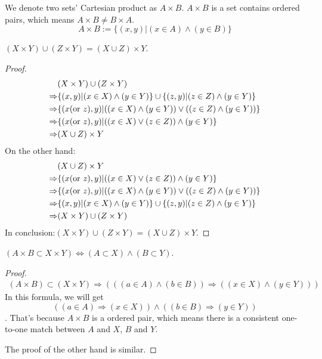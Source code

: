 We denote two sets' Cartesian product as $A \times B $.
$A\times B$ is a set contains ordered pairs, which means $A\times B\neq B\times A$.
\[A\times B:=\{(x,y)|(x\in A)\wedge(y\in B)\}\]
\begin{question}
    $(X\times Y)\cup (Z\times Y)=(X\cup Z)\times Y$.
\end{question}
\begin{proof}
    \[\begin{aligned}
        &(X\times Y)\cup (Z\times Y)\\\Rightarrow&\{(x,y)|(x\in X)\wedge(y\in Y)\}\cup \{(z,y)|(z\in Z)\wedge(y\in Y)\}\\\Rightarrow&\{(x ({\rm or}\ z),y)|((x\in X)\wedge(y\in Y))\vee((z\in Z)\wedge(y\in Y))\}\\\Rightarrow&\{(x ({\rm or}\ z),y)|((x\in X)\vee (z\in Z))\wedge(y\in Y)\}\\\Rightarrow&(X\cup Z)\times Y
    \end{aligned}\]
    On the other hand:
    \[\begin{aligned}
        &(X\cup Z)\times Y\\\Rightarrow&\{(x ({\rm or}\ z),y)|((x\in X)\vee (z\in Z))\wedge(y\in Y)\}\\\Rightarrow&\{(x ({\rm or}\ z),y)|((x\in X)\wedge(y\in Y))\vee((z\in Z)\wedge(y\in Y))\}\\\Rightarrow&\{(x,y)|(x\in X)\wedge(y\in Y)\}\cup \{(z,y)|(z\in Z)\wedge(y\in Y)\}\\\Rightarrow&(X\times Y)\cup (Z\times Y)
    \end{aligned}\]
    In conclusion:$(X\times Y)\cup (Z\times Y)=(X\cup Z)\times Y$.
\end{proof}
\begin{question}
    $(A\times B\subset X\times Y)\Leftrightarrow(A\subset X)\wedge(B\subset Y)$.
\end{question}
\begin{proof}
    \[\begin{aligned}
        (A\times B)\subset (X\times Y)\Rightarrow(((a\in A)\wedge(b\in B))\Rightarrow((x\in X)\wedge(y\in Y)))
    \end{aligned}\]
    In this formula, we will get \[((a\in A)\Rightarrow(x\in X))\wedge((b\in B)\Rightarrow(y\in Y))\]. That's because $A\times B$ is a ordered pair, which means there is a consistent one-to-one match between $A$ and $X$, $B$ and $Y$.
    
    The proof of the other hand is similar.
\end{proof}
